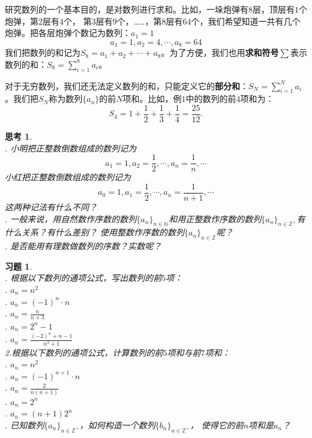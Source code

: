\documentclass[12pt,UTF8]{ctexbook}
\newtheorem{sk}{思考}[section]
\newtheorem{xt}{习题}[section]
\begin{document}
研究数列的一个基本目的，是对数列进行求和。比如，一垛炮弹有$8$层，顶层有$1$个炮弹，第$2$层有$4$个，
第$3$层有$9$个，……，第$8$层有$64$个，我们希望知道一共有几个炮弹。把各层炮弹个数记为数列：$a_1 = 1$
$$ a_1 = 1, a_2 = 4, \cdots, a_8 = 64 $$
我们把数列的和记为$S_8 = a_1 + a_2 + \cdots + a_8$。为了方便，我们也用\textbf{求和符号}$\sum$表示数列的和：$S_8 = \sum_{i=1}^8 a_i$。

对于无穷数列，我们还无法定义数列的和，只能定义它的\textbf{部分和}：$S_N = \sum_{i=1}^N a_i$。我们把$S_N$称为数列$\{a_n\}$的前$N$项和。比如，例$1$中的数列的前$4$项和为：
$$ S_4 = 1 + \frac{1}{2} + \frac{1}{3} + \frac{1}{4} =  \frac{25}{12}. $$

\begin{sk}
    \mbox{}\\
    . 小明把正整数倒数组成的数列记为
    $$a_1 = 1, a_2 = \frac12, \cdots, a_n = \frac1n, \cdots$$
    \indent 小红把正整数倒数组成的数列记为
    $$a_0 = 1, a_1 = \frac12, \cdots, a_n = \frac{1}{n+1}, \cdots$$
    \indent 这两种记法有什么不同？\\
    . 一般来说，用自然数作序数的数列$\{a_n\}_{n\in\mathbb{N}}$和用正整数作序数的数列$\{a_n\}_{n\in\mathbb{Z}^+}$有什么关系？有什么差别？
    使用整数作序数的数列$\{a_n\}_{n\in\mathbb{Z}}$呢？\\
    . 是否能用有理数做数列的序数？实数呢？    
\end{sk}

\begin{xt}
    \mbox{}\\
. 根据以下数列的通项公式，写出数列的前$5$项：\\
. $a_n = n^2$ \\
. $a_n = (-1)^n \cdot n$ \\
. $a_n = \frac{n}{n+3}$ \\
. $a_n = 2^n - 1$ \\
. $a_n = \frac{(-2)^n + n - 1}{n^2 + 1}$ \\
\indent 2.根据以下数列的通项公式，计算数列的前$5$项和与前$7$项和： \\
. $a_n = n^2$ \\
. $a_n = (-1)^{n+1} \cdot n$ \\
. $a_n = \frac{2}{n(n+1)}$ \\
. $a_n = 2^n$ \\
. $a_n = (n+1)2^{n}$ \\
. 已知数列$\{a_n\}_{n\in\mathbb{Z}^+}$，如何构造一个数列$\{b_n\}_{n\in\mathbb{Z}^+}$，
使得它的前$n$项和是$a_n$？
\end{xt}
\end{document}
